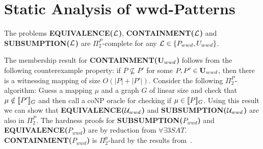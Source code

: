 \section{Static Analysis of wwd-Patterns}

\begin{theorem}
	The problems \textbf{EQUIVALENCE($\mathcal{L}$)}, \textbf{CONTAINMENT($\mathcal{L}$)} and
	\textbf{SUBSUMPTION($\mathcal{L}$)} are $\Pi_2^P$-complete 
	for any $\mathcal{L} \in \{ P_{wwd}, U_{wwd} \}$.
\end{theorem}
\begin{proofidea}
	The membership result for \textbf{CONTAINMENT($\mathbf{U}_{wwd}$)} follows from the following
	counterexample property: 
	if $P \not\subseteq P'$ for some $P,P' \in \mathbf{U}_{wwd}$, then
	there is a witnessing mapping of size $O(|P| + |P'|)$.
	Consider the following $\Pi^P_2$-algorithm:
	Guess a mapping $\mu$ and a graph $G$ of linear size and check that $\mu
	\notin \llbracket P' \rrbracket_G$ and then call a coNP oracle for checking if $\mu
	\in \llbracket P \rrbracket_G$.
	Using this result we can show that \textbf{EQUIVALENCE($\mathcal{U}_{wwd}$)}  
	and \textbf{SUBSUMPTION($\mathcal{U}_{wwd}$)} are also in $\Pi^P_2$.
	The hardness proofs for \textbf{SUBSUMPTION($P_{wwd}$)} and\\
	\textbf{EQUIVALENCE($P_{wwd}$)} are by reduction from
	$\forall\exists3SAT$.\\
	\textbf{CONTAINMENT($P_{wwd}$)} is $\Pi^p_2$-hard by the results from~\cite{pichler2014containment}.
\end{proofidea}
